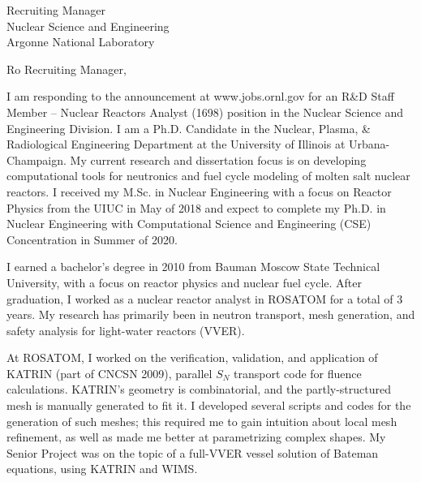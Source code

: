 \documentclass[11pt]{letter} %
\newcommand{\RecipientName}{Recruiting Manager\xspace}
\newcommand{\RecipientAddress}{Nuclear Science and Engineering \\
Argonne National Laboratory}
\begin{document}
\begin{letter}{\RecipientName\\
        \RecipientAddress\xspace}

\address{Andrei Rykhlevskii\\
andreir2@illinois.edu\\
226 Talbot Laboratory\\
104 Wright Street\\
Urbana, IL 61801}


\opening{Ro \RecipientName,}

I am responding to the announcement at www.jobs.ornl.gov for an R\&D Staff 
Member -- Nuclear Reactors Analyst (1698) position in the Nuclear Science and 
Engineering Division. I am a Ph.D. Candidate in the Nuclear, Plasma, \& 
Radiological Engineering Department at the University of Illinois at 
Urbana-Champaign. My current research and dissertation focus is on 
developing computational tools for neutronics and fuel cycle modeling of 
molten salt nuclear reactors.  I received my M.Sc. in Nuclear Engineering with 
a focus on Reactor Physics from the UIUC in May of 2018 and expect to complete 
my Ph.D. in Nuclear Engineering with Computational Science and Engineering 
(CSE) Concentration in Summer of 2020.

I earned a bachelor’s degree in 2010 from Bauman Moscow State Technical 
University, with a focus on reactor physics and nuclear fuel cycle. After 
graduation, I worked as a nuclear reactor analyst in ROSATOM for a total of 3 
years. My research has primarily been in neutron transport, mesh generation, 
and safety analysis for light-water reactors (VVER).

At ROSATOM, I worked on the verification, validation, and application of 
KATRIN (part of CNCSN 2009),  parallel $S_N$ transport code for fluence 
calculations. KATRIN’s geometry is combinatorial, and the partly-structured 
mesh is manually generated to fit it. I developed several scripts and codes 
for the generation of such meshes; this required me to gain intuition about 
local mesh refinement, as well as  made me better at parametrizing complex 
shapes. My Senior Project was on the topic of a full-VVER vessel solution of 
Bateman equations, using KATRIN and WIMS.


\end{letter}
\end{document}
